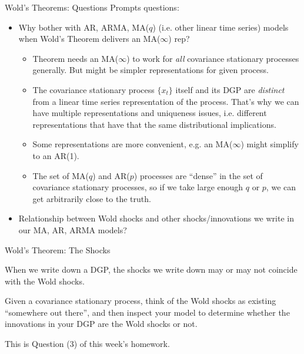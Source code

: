 \documentclass[handout]{beamer}
\begin{document}
\begin{frame}[shrink]{Wold's Theorems: Questions}
Prompts questions:
\begin{itemize}
  \item Why bother with AR, ARMA, MA($q$) (i.e. other linear time
    series) models when Wold's Theorem delivers an MA($\infty$) rep?
    \begin{itemize}
      \item Theorem needs an MA($\infty$) to work for \emph{all}
        covariance stationary processes generally.  But might be simpler
        representations for given process.

      \pause
      \item The covariance stationary \alert{process} $\{x_t\}$ itself
        and its \alert{DGP} are \emph{distinct} from a linear time
        series \alert{representation} of the process.
        That's why we can have multiple representations and uniqueness
        issues, i.e. different representations that have that the same
        distributional implications.

      \pause
      \item Some representations are more convenient, e.g. an
        MA($\infty$) might simplify to an AR(1).

      \pause
      \item The set of MA($q$) and AR($p$) processes are ``dense'' in
        the set of covariance stationary processes, so if we take large
        enough $q$ or $p$, we can get arbitrarily close to the truth.
    \end{itemize}

  \pause
  \item Relationship between Wold shocks and other shocks/innovations we
    write in our MA, AR, ARMA models?
\end{itemize}
\end{frame}



\begin{frame}[shrink]{Wold's Theorem: The Shocks}

When we write down a DGP, the shocks we write down
\alert{may or may not} coincide with the Wold shocks.

Given a covariance stationary process, think of the Wold shocks as
existing ``somewhere out there'', and then inspect your model to
determine whether the innovations in your DGP are the Wold shocks or
not.

This is Question (3) of this week's homework.
%
%
%
\end{frame}
\end{document}
